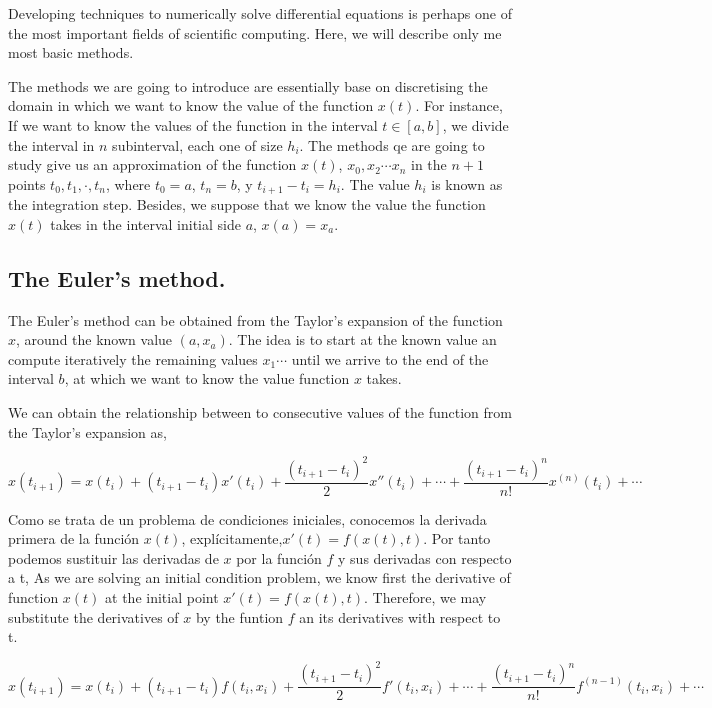\begin{paracol}{2}
Developing techniques to numerically solve differential equations is perhaps one of the most important fields of scientific computing. Here, we will describe only me most basic me\-thods.

The methods we are going to introduce are essentially base on discretising the domain in which we want to know the value of the function $x(t)$. For instance, If we want to know the values of the function in the interval $t \in [a,b]$, we divide the interval in $n$ subinterval, each one of size $h_i$. The methods qe are going to study give us an approximation of the function $x(t)$, $x_0,x_2\cdots x_n$ in the $n+1$ points $t_0,t_1,\cdot, t_n$, where $t_0=a$, $t_n=b$, y $t_{i+1}-t_i=h_i$. The value $h_i$ is known as the integration step. Besides, we suppose that we know the value the function $x(t)$ takes in the interval initial side $a$, $x(a) = x_a$.

\subsection{The Euler's method.}
The Euler's method can be obtained from the Taylor's expansion of the function $x$, around the known value $(a,x_a)$. The idea is to start at the known value an compute iteratively the remaining values $x_1\cdots$ until we arrive to the end of the interval $b$, at which we want to know the value function $x$ takes.

We can obtain the relationship between to consecutive values of the function from the Taylor's expansion as, 
\end{paracol}
\begin{equation*}
x(t_{i+1})=x(t_i)+(t_{i+1}-t_{i})x'(t_i)+\frac{(t_{i+1}-t_{i})^2}{2}x''(t_i)+\cdots+ \frac{(t_{i+1}-t_i)^n}{n!}x^{(n)}(t_i)+\cdots
\end{equation*}
\begin{paracol}{2}
Como se trata de un problema de condiciones iniciales, conocemos la derivada primera de la función $x(t)$, explícitamente,$x'(t)=f(x(t),t)$. Por tanto podemos sustituir las derivadas de $x$ por la función $f$ y sus derivadas con respecto a t,
\switchcolumn
As we are solving an initial condition problem, we know first the derivative of function $x(t)$ at the initial point $x'(t) = f(x(t),t)$. Therefore, we may substitute  the derivatives of $x$ by the funtion $f$ an its derivatives with respect to t.
\end{paracol}
\begin{equation*}
x(t_{i+1})=x(t_i)+(t_{i+1}-t_{i})f(t_i,x_i)+\frac{(t_{i+1}-t_{i})^2}{2}f'(t_i,x_i)+\cdots+ \frac{(t_{i+1}-t_i)^n}{n!}f^{(n-1)}(t_i,x_i)+\cdots
\end{equation*}
